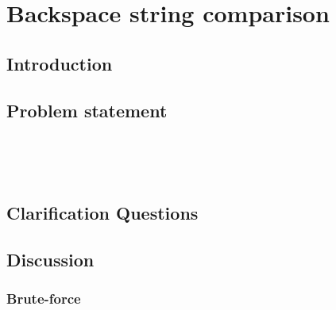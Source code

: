 %

\chapter{Backspace string comparison}
\label{ch:backspace_string_compare}
\section*{Introduction}

\section{Problem statement}
\begin{exercise}

\end{exercise}


\begin{example}
	\hfill \
	
\end{example}

\begin{example}
	\hfill \
	
\end{example}

\section{Clarification Questions}

\begin{QandA}
	\item 
	\begin{answered}
		\textit{}
	\end{answered}
	
\end{QandA}

\section{Discussion}
\label{backspace_string_compare:sec:discussion}


\subsection{Brute-force}
\label{backspace_string_compare:sec:bruteforce}



